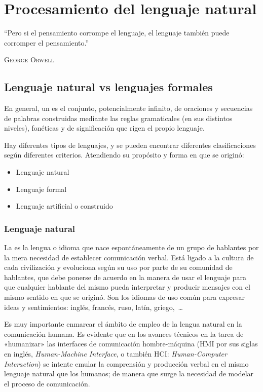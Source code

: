 
\chapter{Procesamiento del lenguaje natural}

\epigraph{``Pero si el pensamiento corrompe el lenguaje, el lenguaje también puede corromper el pensamiento.''}{\textsc{George Orwell}}

\section{Lenguaje natural vs lenguajes formales}

En general, un  es el conjunto, potencialmente infinito, de oraciones y secuencias de palabras construidas mediante las reglas gramaticales (en sus distintos niveles), fonéticas y de significación que rigen el propio lenguaje.

Hay diferentes tipos de lenguajes, y se pueden encontrar diferentes clasificaciones según diferentes criterios. Atendiendo su propósito y forma en que se originó:
\nopagebreak
\begin{itemize}
\item Lenguaje natural
\item Lenguaje formal
\item Lenguaje artificial o construido
\end{itemize}

\subsection{Lenguaje natural}

La  es la lengua o idioma que nace espontáneamente de un grupo de hablantes por la mera necesidad de establecer comunicación verbal. Está ligado a la cultura de cada civilización y evoluciona según su uso por parte de su comunidad de hablantes, que debe ponerse de acuerdo en la manera de usar el lenguaje para que cualquier hablante del mismo pueda interpretar y producir mensajes con el mismo sentido en que se originó. Son los idiomas de uso común para expresar ideas y sentimientos: inglés, francés, ruso, latín, griego,~\ldots

Es muy importante enmarcar el ámbito de empleo de la lengua natural en la comunicación humana. Es evidente que en los avances técnicos en la tarea de «humanizar» las interfaces de comunicación hombre-máquina (HMI por sus siglas en inglés, \emph{Human-Machine Interface}, o también HCI: \emph{Human-Computer Interaction}) se intente emular la comprensión y producción verbal en el mismo lenguaje natural que los humanos; de manera que surge la necesidad de modelar el proceso de comunicación.

